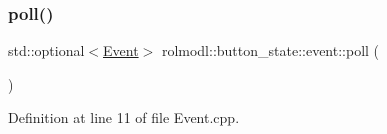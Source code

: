 \subsubsection{\texorpdfstring{poll()}{poll()}}
{\footnotesize\ttfamily std\+::optional$<$\mbox{\hyperlink{namespacerolmodl_1_1button__state_aef4672e4b037d3f04e71d731caf34aa9}{Event}}$>$ rolmodl\+::button\+\_\+state\+::event\+::poll (\begin{DoxyParamCaption}{ }\end{DoxyParamCaption})\hspace{0.3cm}{\ttfamily [noexcept]}}



Definition at line 11 of file Event.\+cpp.


